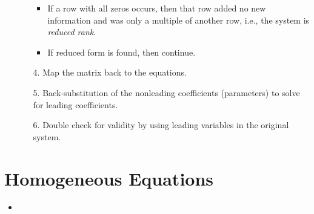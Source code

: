 \begin{itemize}
\begin{itemize}
\begin{itemize}
      \item If a row with all zeros occurs, then that row added no new information and was only a multiple of another row, i.e., the system is \emph{reduced rank}.
      \item If reduced form is found, then continue.
    \end{itemize} 
    \item[4.] Map the matrix back to the equations.
    \item[5.] Back-substitution of the nonleading coefficients (parameters) to solve for leading coefficients.
    \item[6.] Double check for validity by using leading variables in the original system. 
  \end{itemize}
  
\end{itemize}
  
\section{Homogeneous Equations}\label{Homogeneous Equations}
\begin{itemize}
  \item 
\end{itemize}
  
  
